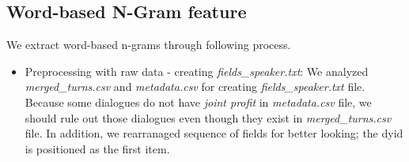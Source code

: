 \documentclass[11pt]{article} %
\begin{document}
\subsection{Word-based N-Gram feature}
We extract word-based n-grams through following process.
\begin{itemize}
\item Preprocessing with raw data - creating \textit{fields\_speaker.txt}: \newline
We analyzed \textit{merged\_turns.csv} and \textit{metadata.csv} for creating \textit{fields\_speaker.txt} file. Because some dialogues do not have \textit{joint profit} in \textit{metadata.csv} file, we should rule out those dialogues even though they exist in \textit{merged\_turns.csv} file. In addition, we rearranaged sequence of fields for better looking; the dyid is positioned as the first item.


\end{itemize}
\end{document}
